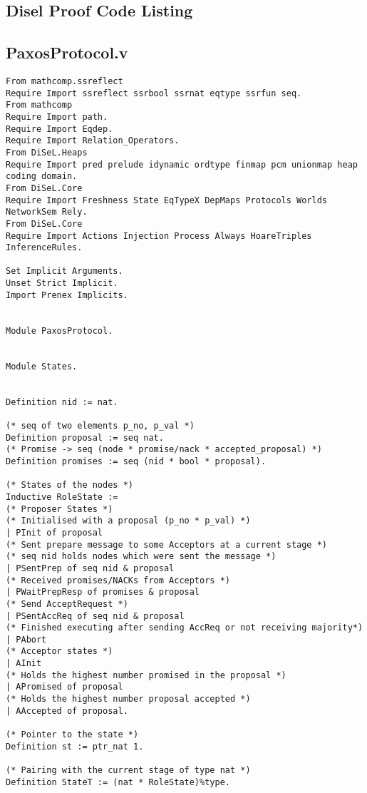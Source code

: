 \begin{landscape}

\chapter{Disel Proof Code Listing}

\section{PaxosProtocol.v}
\begin{multicols*}{2}
\begin{lstlisting}[style=SourceCodeListing]
From mathcomp.ssreflect
Require Import ssreflect ssrbool ssrnat eqtype ssrfun seq.
From mathcomp
Require Import path.
Require Import Eqdep.
Require Import Relation_Operators.
From DiSeL.Heaps
Require Import pred prelude idynamic ordtype finmap pcm unionmap heap coding domain.
From DiSeL.Core
Require Import Freshness State EqTypeX DepMaps Protocols Worlds NetworkSem Rely.
From DiSeL.Core
Require Import Actions Injection Process Always HoareTriples InferenceRules.

Set Implicit Arguments.
Unset Strict Implicit.
Import Prenex Implicits.


Module PaxosProtocol.


Module States.


Definition nid := nat.

(* seq of two elements p_no, p_val *)
Definition proposal := seq nat.
(* Promise -> seq (node * promise/nack * accepted_proposal) *)
Definition promises := seq (nid * bool * proposal).

(* States of the nodes *)
Inductive RoleState :=
(* Proposer States *)
(* Initialised with a proposal (p_no * p_val) *)
| PInit of proposal
(* Sent prepare message to some Acceptors at a current stage *)
(* seq nid holds nodes which were sent the message *)
| PSentPrep of seq nid & proposal
(* Received promises/NACKs from Acceptors *)
| PWaitPrepResp of promises & proposal
(* Send AcceptRequest *)
| PSentAccReq of seq nid & proposal
(* Finished executing after sending AccReq or not receiving majority*)
| PAbort
(* Acceptor states *)
| AInit
(* Holds the highest number promised in the proposal *)
| APromised of proposal
(* Holds the highest number proposal accepted *)
| AAccepted of proposal.

(* Pointer to the state *)
Definition st := ptr_nat 1.

(* Pairing with the current stage of type nat *)
Definition StateT := (nat * RoleState)%type.



\end{lstlisting}
\end{multicols*}
\end{landscape}
